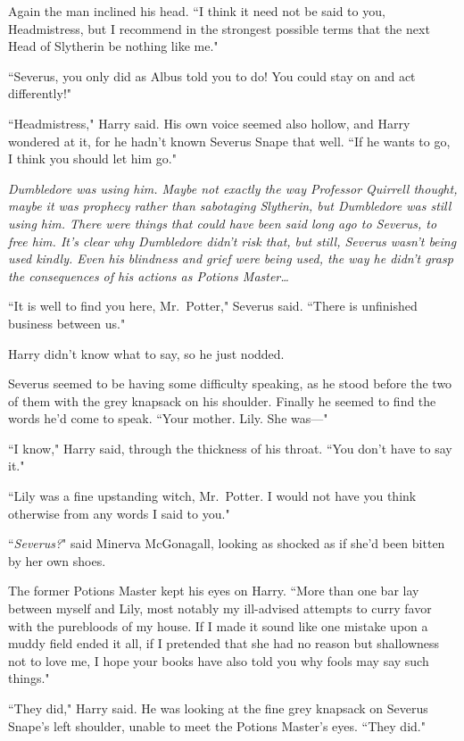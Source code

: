 Again the man inclined his head. ``I think it need not be said to you, Headmistress, but I recommend in the strongest possible terms that the next Head of Slytherin be nothing like me."

``Severus, you only did as Albus told you to do! You could stay on and act differently!"

``Headmistress," Harry said. His own voice seemed also hollow, and Harry wondered at it, for he hadn't known Severus Snape that well. ``If he wants to go, I think you should let him go."

\emph{Dumbledore was using him. Maybe not exactly the way Professor Quirrell thought, maybe it was prophecy rather than sabotaging Slytherin, but Dumbledore was still using him. There were things that could have been said long ago to Severus, to free him. It's clear why Dumbledore didn't risk that, but still, Severus wasn't being used kindly. Even his blindness and grief were being used, the way he didn't grasp the consequences of his actions as Potions Master{\ldots}}

``It is well to find you here, Mr.~Potter," Severus said. ``There is unfinished business between us."

Harry didn't know what to say, so he just nodded.

Severus seemed to be having some difficulty speaking, as he stood before the two of them with the grey knapsack on his shoulder. Finally he seemed to find the words he'd come to speak. ``Your mother. Lily. She was—"

``I know," Harry said, through the thickness of his throat. ``You don't have to say it."

``Lily was a fine upstanding witch, Mr.~Potter. I would not have you think otherwise from any words I said to you."

``\emph{Severus?}" said Minerva McGonagall, looking as shocked as if she'd been bitten by her own shoes.

The former Potions Master kept his eyes on Harry. ``More than one bar lay between myself and Lily, most notably my ill-advised attempts to curry favor with the purebloods of my house. If I made it sound like one mistake upon a muddy field ended it all, if I pretended that she had no reason but shallowness not to love me, I hope your books have also told you why fools may say such things."

``They did," Harry said. He was looking at the fine grey knapsack on Severus Snape's left shoulder, unable to meet the Potions Master's eyes. ``They did."

